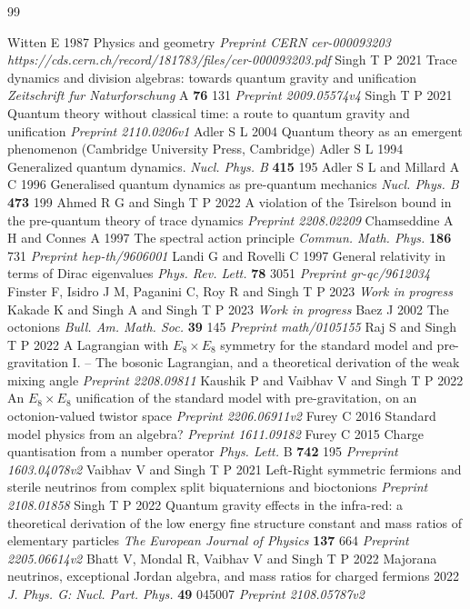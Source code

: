 \documentclass[a4paper]{jpconf}
\begin{document}
\begin{thebibliography}{99}

\smallskip

 Witten E 1987 Physics and geometry {\it Preprint CERN cer-000093203 https://cds.cern.ch/record/181783/files/cer-000093203.pdf}
 Singh T P 2021 Trace dynamics and division algebras: towards quantum gravity and unification {\it Zeitschrift fur Naturforschung} A {\bf 76} 131 {\it Preprint 2009.05574v4}
 Singh T P 2021 Quantum theory without classical time: a route to quantum gravity and unification {\it Preprint 2110.0206v1}
 Adler S L 2004 Quantum theory as an emergent phenomenon (Cambridge University Press, Cambridge)
 Adler S L 1994 Generalized quantum dynamics. {\it Nucl. Phys. B} {\bf 415} 195
 Adler S L and Millard A C 1996 Generalised quantum dynamics as pre-quantum
mechanics {\it Nucl. Phys. B} {\bf 473} 199
 Ahmed R G and Singh T P 2022 A violation of the Tsirelson bound in the pre-quantum theory of trace dynamics {\it Preprint 2208.02209}
 Chamseddine A H and Connes A 1997 The spectral action principle {\it Commun. Math. Phys.} {\bf 186} 731 {\it Preprint hep-th/9606001}
 Landi G and Rovelli C 1997 General relativity in terms of Dirac eigenvalues {\it Phys. Rev. Lett.} {\bf 78} 3051 {\it Preprint gr-qc/9612034}
 Finster F, Isidro J M, Paganini C, Roy R and Singh T P 2023 {\it Work in progress}
 Kakade K and Singh A and Singh T P 2023 {\it Work in progress}
 Baez J 2002 The octonions {\it Bull. Am. Math. Soc.} {\bf 39} 145 {\it Preprint math/0105155}
 Raj S and Singh T P 2022 A Lagrangian with $E_8\times E_8$ symmetry for the standard model and pre-gravitation I. -- The bosonic Lagrangian, and a theoretical derivation of the weak mixing angle {\it Preprint 2208.09811}
 Kaushik P and Vaibhav V and Singh T P 2022 An $E_8 \times E_8$ unification of the standard model with pre-gravitation, on an octonion-valued twistor space {\it Preprint 2206.06911v2}
 Furey C 2016 Standard model physics from an algebra? {\it Preprint 1611.09182}
 Furey C 2015 Charge quantisation from a number operator {\it Phys. Lett.} B {\bf 742} 195 {\it Prreprint 1603.04078v2}
 Vaibhav V and Singh T P 2021 Left-Right symmetric fermions and sterile neutrinos from complex split biquaternions and bioctonions {\it Preprint 2108.01858}
 Singh T P 2022 Quantum gravity effects in the infra-red: a theoretical derivation of the low energy fine structure constant and mass ratios of elementary particles {\it The European Journal of Physics} {\bf 137} 664 {\it Preprint 2205.06614v2}
 Bhatt V, Mondal R, Vaibhav V and Singh T P 2022 Majorana neutrinos, exceptional Jordan algebra, and mass ratios for charged fermions 2022 {\it J. Phys. G: Nucl. Part. Phys.} {\bf 49} 045007 {\it Preprint 2108.05787v2}


\end{thebibliography}
\end{document}
